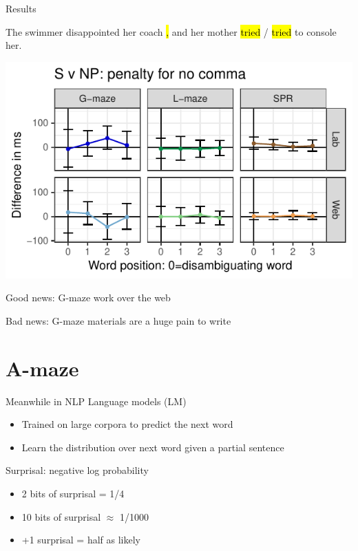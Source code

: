 \documentclass[12pt, xcolor=beamer,table,dvipsnames, ignorenonframetext, ngerman]{beamer}
\makeatletter
\let\HL\hl
\renewcommand\hl{%
	\let\set@color\beamerorig@set@color
	\let\reset@color\beamerorig@reset@color
	\HL}
\makeatother
\begin{document}
\begin{frame}{Results}
\begin{small}	
The swimmer disappointed her coach\hl{,} and her mother \hl{tried} / \hl{tried} to console her.
\end{small}
\includegraphics[width=\textwidth]{g_svnp.pdf}
\end{frame}
\begin{frame}
Good news: G-maze work over the web

Bad news: G-maze materials are a huge pain to write
\end{frame}

\section{A-maze}

\begin{frame}{Meanwhile in NLP}
Language models (LM)
\begin{itemize}
	\item Trained on large corpora to predict the next word
	\item Learn the distribution over next word given a partial sentence
\end{itemize}
Surprisal: negative log probability
\begin{itemize}
	\item 2 bits of surprisal = 1/4
	\item 10 bits of surprisal $\approx$ 1/1000 
	\item +1 surprisal = half as likely
\end{itemize}
\end{frame}
\end{document}
